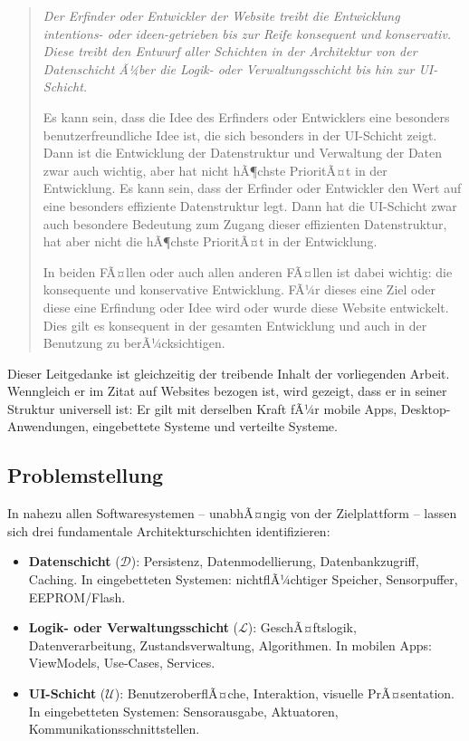 ﻿\documentclass[a4paper,12pt]{article}
\theoremstyle{definition}
\begin{document}
\begin{quote}
\itshape
\glqq{}Der Erfinder oder Entwickler der Website treibt die Entwicklung
intentions- oder ideen-getrieben bis zur Reife konsequent und konservativ.
Diese treibt den Entwurf aller Schichten in der Architektur von der Datenschicht
Ã¼ber die Logik- oder Verwaltungsschicht bis hin zur UI-Schicht.

Es kann sein, dass die Idee des Erfinders oder Entwicklers eine besonders
benutzerfreundliche Idee ist, die sich besonders in der UI-Schicht zeigt.
Dann ist die Entwicklung der Datenstruktur und Verwaltung der Daten zwar auch
wichtig, aber hat nicht hÃ¶chste PrioritÃ¤t in der Entwicklung. Es kann sein,
dass der Erfinder oder Entwickler den Wert auf eine besonders effiziente
Datenstruktur legt. Dann hat die UI-Schicht zwar auch besondere Bedeutung
zum Zugang dieser effizienten Datenstruktur, hat aber nicht die hÃ¶chste
PrioritÃ¤t in der Entwicklung.

In beiden FÃ¤llen oder auch allen anderen FÃ¤llen ist dabei wichtig: die
konsequente und konservative Entwicklung. FÃ¼r dieses eine Ziel oder diese
eine Erfindung oder Idee wird oder wurde diese Website entwickelt. Dies gilt
es konsequent in der gesamten Entwicklung und auch in der Benutzung zu
berÃ¼cksichtigen.\grqq{} \upshape\cite{epp2026paradigma}
\end{quote}

Dieser Leitgedanke ist gleichzeitig der treibende Inhalt der vorliegenden Arbeit.
Wenngleich er im Zitat auf Websites bezogen ist, wird gezeigt, dass er in seiner
Struktur universell ist: Er gilt mit derselben Kraft fÃ¼r mobile Apps,
Desktop-Anwendungen, eingebettete Systeme und verteilte Systeme.

\subsection{Problemstellung}

In nahezu allen Softwaresystemen -- unabhÃ¤ngig von der Zielplattform -- lassen
sich drei fundamentale Architekturschichten identifizieren:

\begin{itemize}
    \item \textbf{Datenschicht} ($\mathcal{D}$): Persistenz, Datenmodellierung,
          Datenbankzugriff, Caching. In eingebetteten Systemen: nichtflÃ¼chtiger
          Speicher, Sensorpuffer, EEPROM/Flash.
    \item \textbf{Logik- oder Verwaltungsschicht} ($\mathcal{L}$):
          GeschÃ¤ftslogik, Datenverarbeitung, Zustandsverwaltung, Algorithmen.
          In mobilen Apps: ViewModels, Use-Cases, Services.
    \item \textbf{UI-Schicht} ($\mathcal{U}$): BenutzeroberflÃ¤che, Interaktion,
          visuelle PrÃ¤sentation. In eingebetteten Systemen: Sensorausgabe,
          Aktuatoren, Kommunikationsschnittstellen.
\end{itemize}
\end{document}
